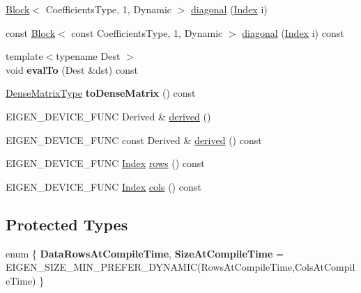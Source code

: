 \begin{DoxyCompactItemize}
\item 
\mbox{\hyperlink{class_eigen_1_1_block}{Block}}$<$ Coefficients\+Type, 1, Dynamic $>$ \mbox{\hyperlink{class_eigen_1_1internal_1_1_band_matrix_base_a51ce12f0be57b0c2593c20c865de6af1}{diagonal}} (\mbox{\hyperlink{struct_eigen_1_1_eigen_base_a554f30542cc2316add4b1ea0a492ff02}{Index}} i)
\item 
const \mbox{\hyperlink{class_eigen_1_1_block}{Block}}$<$ const Coefficients\+Type, 1, Dynamic $>$ \mbox{\hyperlink{class_eigen_1_1internal_1_1_band_matrix_base_a8f7146e80405018d6d0827c4a7713ad3}{diagonal}} (\mbox{\hyperlink{struct_eigen_1_1_eigen_base_a554f30542cc2316add4b1ea0a492ff02}{Index}} i) const
\item 
\mbox{\label{class_eigen_1_1internal_1_1_band_matrix_base_a48c573fc9b58a2d4dd0741b284124a64}} 
{\footnotesize template$<$typename Dest $>$ }\\void {\bfseries eval\+To} (Dest \&dst) const
\item 
\mbox{\label{class_eigen_1_1internal_1_1_band_matrix_base_aacfa0b85201b8503376a9998987f81f7}} 
\mbox{\hyperlink{class_eigen_1_1_matrix}{Dense\+Matrix\+Type}} {\bfseries to\+Dense\+Matrix} () const
\item 
E\+I\+G\+E\+N\+\_\+\+D\+E\+V\+I\+C\+E\+\_\+\+F\+U\+NC Derived \& \mbox{\hyperlink{class_eigen_1_1internal_1_1_band_matrix_base_a324b16961a11d2ecfd2d1b7dd7946545}{derived}} ()
\item 
E\+I\+G\+E\+N\+\_\+\+D\+E\+V\+I\+C\+E\+\_\+\+F\+U\+NC const Derived \& \mbox{\hyperlink{class_eigen_1_1internal_1_1_band_matrix_base_ad0cbee5e2dfef3bbe9db5e6d5fe12cc0}{derived}} () const
\item 
E\+I\+G\+E\+N\+\_\+\+D\+E\+V\+I\+C\+E\+\_\+\+F\+U\+NC \mbox{\hyperlink{struct_eigen_1_1_eigen_base_a554f30542cc2316add4b1ea0a492ff02}{Index}} \mbox{\hyperlink{class_eigen_1_1internal_1_1_band_matrix_base_a8141320ba8df384426c298b32b000d8e}{rows}} () const
\item 
E\+I\+G\+E\+N\+\_\+\+D\+E\+V\+I\+C\+E\+\_\+\+F\+U\+NC \mbox{\hyperlink{struct_eigen_1_1_eigen_base_a554f30542cc2316add4b1ea0a492ff02}{Index}} \mbox{\hyperlink{class_eigen_1_1internal_1_1_band_matrix_base_a7b0b45c7351847696c911ce8aa2abbdb}{cols}} () const
\end{DoxyCompactItemize}
\subsection*{Protected Types}
\begin{DoxyCompactItemize}
\item 
\mbox{\label{class_eigen_1_1internal_1_1_band_matrix_base_a10d2320fd9ca211d8f25ec2f8b7312f3}} 
enum \{ {\bfseries Data\+Rows\+At\+Compile\+Time}, 
{\bfseries Size\+At\+Compile\+Time} = E\+I\+G\+E\+N\+\_\+\+S\+I\+Z\+E\+\_\+\+M\+I\+N\+\_\+\+P\+R\+E\+F\+E\+R\+\_\+\+D\+Y\+N\+A\+M\+IC(Rows\+At\+Compile\+Time,Cols\+At\+Compile\+Time)
 \}
\end{DoxyCompactItemize}

